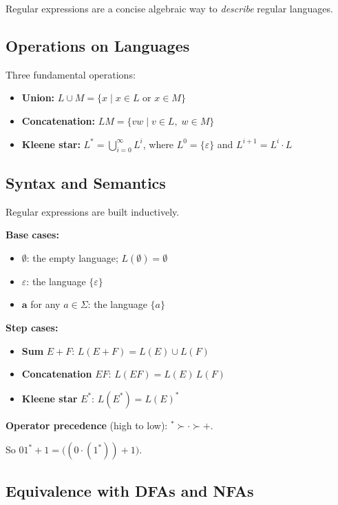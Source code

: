 \documentclass[11pt, a4paper]{article}
\theoremstyle{definition}
\theoremstyle{remark}
\begin{document}
Regular expressions are a concise algebraic way to \emph{describe} regular languages.

\subsection{Operations on Languages}

\begin{defbox}
Three fundamental operations:
\begin{itemize}[itemsep=4pt]
  \item \textbf{Union:} $L\cup M=\{x\mid x\in L\text{ or }x\in M\}$
  \item \textbf{Concatenation:} $LM=\{vw\mid v\in L,\;w\in M\}$
  \item \textbf{Kleene star:} $L^*=\bigcup_{i=0}^{\infty}L^i$, where
        $L^0=\{\varepsilon\}$ and $L^{i+1}=L^i\cdot L$
\end{itemize}
\end{defbox}

\subsection{Syntax and Semantics}

Regular expressions are built inductively.

\textbf{Base cases:}
\begin{itemize}
  \item $\emptyset$: the empty language; $L(\emptyset)=\emptyset$
  \item $\varepsilon$: the language $\{\varepsilon\}$
  \item $\mathbf{a}$ for any $a\in\Sigma$: the language $\{a\}$
\end{itemize}

\textbf{Step cases:}
\begin{itemize}
  \item \textbf{Sum} $E+F$: $L(E+F)=L(E)\cup L(F)$
  \item \textbf{Concatenation} $EF$: $L(EF)=L(E)\,L(F)$
  \item \textbf{Kleene star} $E^*$: $L(E^*)=L(E)^*$
\end{itemize}

\textbf{Operator precedence} (high to low): ${}^*\succ{\cdot}\succ{+}$.

So $01^*+1=\bigl((0\cdot(1^*))+1\bigr)$.

\subsection{Equivalence with DFAs and NFAs}
\end{document}
